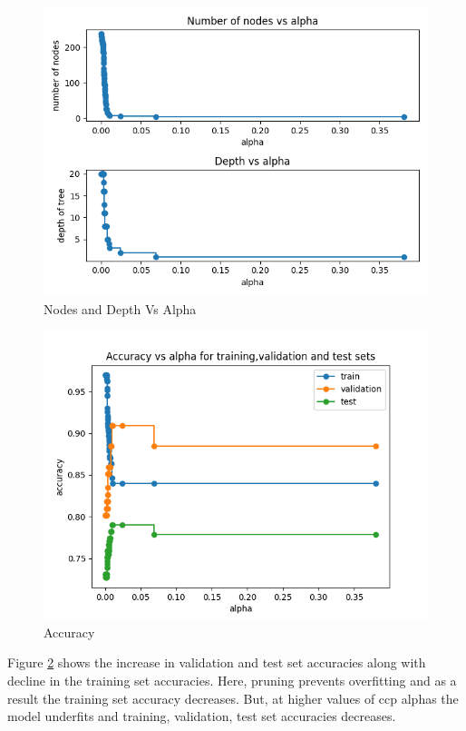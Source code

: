 \documentclass[11pt]{article}
\begin{document}
\begin{figure}[H]
  \includegraphics[width=\linewidth]{1_c_nodeVsAlpha__depthVsAlpha.png}
  \caption{Nodes and Depth Vs Alpha}
  \label{fig1B}
\end{figure}
\begin{figure}[H]
  \includegraphics[width=\linewidth]{1_c_Accuracy.png}
  \caption{Accuracy}
  \label{acc}
\end{figure}
Figure \ref{acc} shows the increase in validation and test set accuracies along with decline in the training set accuracies. Here, pruning prevents overfitting and as a result the training set accuracy decreases. But, at higher values of ccp alphas the model underfits and training, validation, test set accuracies decreases.
\end{document}
